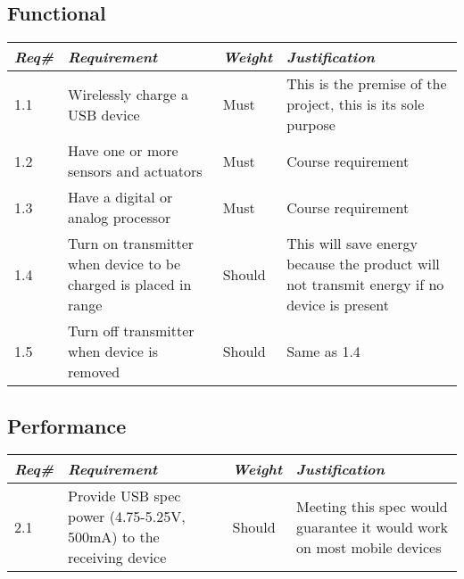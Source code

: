     \subsection{Functional}
        \begin{centering}
        \begin{tabular}{|l|m{7cm}|l|m{7cm}|} \hline
        \textit{\textbf{Req\#}}	& \textit{\textbf{Requirement}} &\textit{\textbf{Weight}}&\textit{\textbf{Justification}} \\ \hline
        1.1	& Wirelessly charge a USB device & Must	& This is the premise of the project, this is its sole purpose \\ \hline
        1.2	& Have one or more sensors and actuators & Must	& Course requirement \\ \hline
        1.3	& Have a digital or analog processor & Must	& Course requirement \\ \hline
        1.4	& Turn on transmitter when device to be charged is placed in range	& Should & This will save energy because the product will not transmit energy if no device is present \\ \hline
        1.5 & Turn off transmitter when device is removed	& Should & Same as 1.4 \\ \hline
        \end{tabular}
        \end{centering}
        
    \subsection{Performance}
        \begin{centering}
        \begin{tabular}{|l|m{7cm}|l|m{7cm}|} \hline
        \textit{\textbf{Req\#}}	& \textit{\textbf{Requirement}} &\textit{\textbf{Weight}}&\textit{\textbf{Justification}} \\ \hline
        2.1	& Provide USB spec power (4.75-5.25V, 500mA) \cite{USB20}to the receiving device& Should & Meeting this spec would guarantee it would work on most mobile devices \\ \hline
        \end{tabular}
        \end{centering}
        
